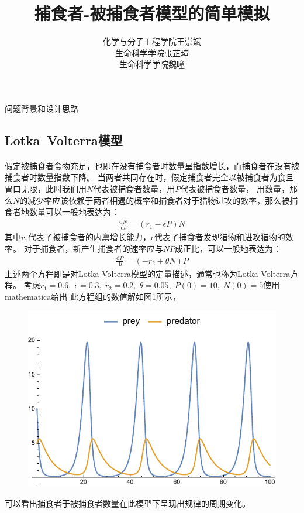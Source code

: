 \documentclass[a4paper]{ctexart}
\title{\textbf{捕食者-被捕食者模型的简单模拟}}
\author{化学与分子工程学院\;王崇斌\;1800011716\\生命科学学院\;张芷瑄\;1800012192\\生命科学学院\;魏曈\;1800012140}
\date{}
\makeatletter
\def\d{\mathrm{d}}
\renewcommand{\section}{\@startsection{section}{1}{0mm}
	{-\baselineskip}{0.5\baselineskip}{\bf\leftline}}
\makeatother
\begin{document}
    \pagestyle{fancy}
	\chead{}
	\rhead{}
	\maketitle
	\thispagestyle{fancy}
	\section{\Large{问题背景和设计思路}}
	\subsection{\large{Lotka–Volterra模型}}
	\paragraph{}假定被捕食者食物充足，也即在没有捕食者时数量呈指数增长，而捕食者在没有被捕食者时数量指数下降。
	当两者共同存在时，假定捕食者完全以被捕食者为食且胃口无限，此时我们用$N$代表被捕食者数量，用$P$代表被捕食者数量，
	用数量，那么$N$的减少率应该依赖于两者相遇的概率和捕食者对于猎物进攻的效率，那么被捕食者地数量可以一般地表达为：
	\begin{align}
		\frac{\d N}{\d t} = (r_{1} - \epsilon P)N
	\end{align}
	其中$r_{1}$代表了被捕食者的内禀增长能力，$\epsilon$代表了捕食者发现猎物和进攻猎物的效率。
	对于捕食者，新产生捕食者的速率应与$NP$成正比，可以一般地表达为：
	\begin{align}
		\frac{\d P}{\d t} = (-r_{2} + \theta N)P
	\end{align}
	上述两个方程即是对Lotka-Volterra模型的定量描述，通常也称为Lotka-Volterra方程。
	考虑$r_{1} = 0.6,\;\epsilon=0.3,\;r_{2} = 0.2,\;\theta=0.05,\;P(0) = 10,\;N(0)=5$使用mathematica给出
	此方程组的数值解如图1所示，
	\begin{figure}[htbp]
		\centering
		\includegraphics[scale=0.90]{lotka-volterra.pdf}
		\caption{}
	\end{figure}
	可以看出捕食者于被捕食者数量在此模型下呈现出规律的周期变化。
\end{document}
